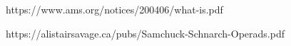 https://www.ams.org/notices/200406/what-is.pdf

https://alistairsavage.ca/pubs/Samchuck-Schnarch-Operads.pdf

